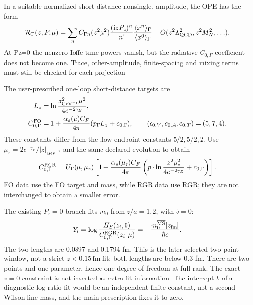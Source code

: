 \documentclass[11pt]{article}
\numberwithin{equation}{section}
\newcommand{\ii}{\mathrm{i}}
\begin{document}
In a suitable normalized short-distance nonsinglet amplitude, the OPE has
the form
\begin{equation}
 \mathcal R_\Gamma(z,P,\mu)
 =\sum_n C_{\Gamma n}(z^2\mu^2)
 \frac{(\ii zP_z)^n}{n!}
 \frac{\langle x^n\rangle_\Gamma}{\langle x^0\rangle_\Gamma}
 +O(z^2\Lambda_{\rm QCD}^2,z^2M_N^2,\ldots).
\label{eq:l32x64-short-distance-OPE}
\end{equation}
At Pz=0 the nonzero Ioffe-time powers vanish, but the radiative
\(C_{0,\Gamma}\) coefficient does not become one.  Trace, other-amplitude,
finite-spacing and mixing terms must still be checked for each projection.

The user-prescribed one-loop short-distance targets are
\begin{align}
 L_z&=\ln\frac{z_{\mathrm{GeV}^{-1}}^2\mu^2}{4e^{-2\gamma_E}},\\
 C_{0,\Gamma}^{\rm FO}
 &=1+\frac{\alpha_s(\mu)C_F}{4\pi}
       (p_\Gamma L_z+c_{0,\Gamma}),\qquad
 (c_{0,V},c_{0,A},c_{0,T})=(5,7,4).
\label{eq:l32x64-short-distance-target}
\end{align}
These constants differ from the flow endpoint constants \(5/2,5/2,2\).
Use \(\mu_z=2e^{-\gamma_E}/|z|_{\mathrm{GeV}^{-1}}\) and the same
declared evolution to obtain
\begin{equation}
 C_{0,\Gamma}^{\rm RGR}
 =U_\Gamma(\mu,\mu_z)
 \left[1+\frac{\alpha_s(\mu_z)C_F}{4\pi}
 \left(p_\Gamma\ln\frac{z^2\mu_z^2}{4e^{-2\gamma_E}}
       +c_{0,\Gamma}\right)\right].
\label{eq:l32x64-C0-RGR}
\end{equation}
FO data use the FO target and mass, while RGR data use RGR; they are
not interchanged to obtain a smaller error.

The existing \(P_z=0\) branch fits \(m_0\) from \(z/a=1,2\), with \(b=0\):
\begin{equation}
 Y_i=\log\frac{H_S(z_i,0)}{C_{0,\Gamma}^{\rm RGR}(z_i,\mu)}
 =-\frac{m_0^{\overline{\mathrm{MS}}}|z_{\rm fm}|}{\hbar c}.
\label{eq:l32x64-m0-fit}
\end{equation}
The two lengths are 0.0897 and 0.1794 fm.  This is the later selected
two-point window, not a strict \(z<0.15\,\mathrm{fm}\) fit; both lengths
are below 0.3 fm.  There are two points and one parameter, hence one
degree of freedom at full rank.  The exact \(z=0\) constraint is not
inserted as extra fit information.  The intercept \(b\) of a diagnostic
log-ratio fit would be an independent finite constant, not a second
Wilson line mass, and the main prescription fixes it to zero.
\end{document}
